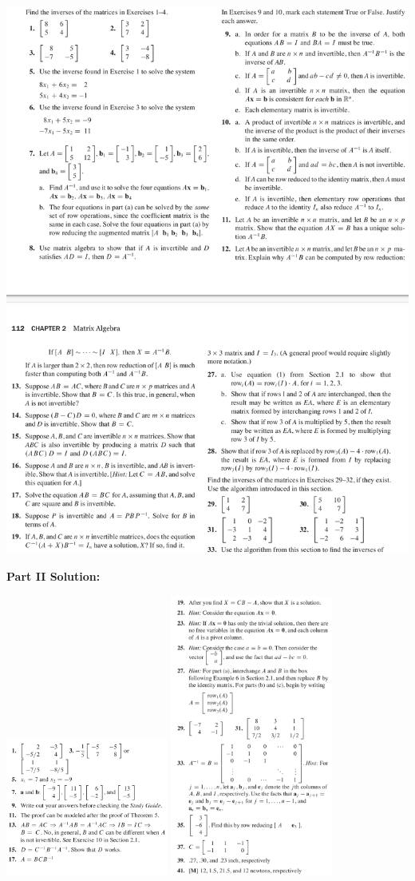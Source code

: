 \documentclass[a4paper,11pt,reqno]{amsart}
\numberwithin{equation}{section}
\begin{document}
\includegraphics[width=\textwidth]{exercises/mo_2.png}

\newpage

\textbf{Part II Solution:}

\includegraphics[width=0.4\textwidth]{exercises/mo_2ans1.png}
\includegraphics[width=0.4\textwidth]{exercises/mo_2ans2.png}
\end{document}
